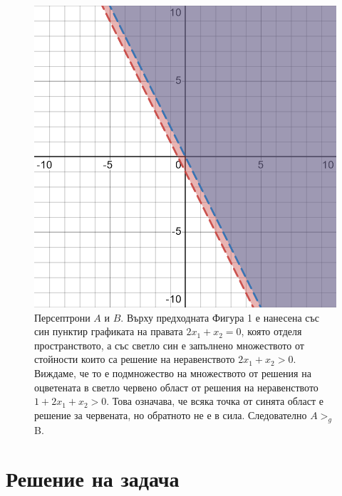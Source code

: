 \documentclass[12pt]{article}
\begin{document}
	\newpage
	\begin{figure}[H]
		\centering
		\includegraphics[width=140mm]{desmos-graph(1).png} 
		\caption{Персептрони $A$ и $B$. Върху предходната Фигура 1 е нанесена със син пунктир графиката на правата $2x_{1} + x_{2} = 0$, която отделя пространството, а със светло син е запълнено множеството от стойности които са решение на неравенството $2x_{1} + x_{2} > 0$. Виждаме, че то е подмножество на множеството от решения на оцветената в светло червено област от решения на неравенството $1 + 2x_{1} + x_{2} > 0$. Това означава, че всяка точка от синята област е решение за червената, но обратното не е в сила. Следователно $A >_{g}$ B.}
	\end{figure}

		
	\newpage
	
	\section{Решение на задача }
	
\end{document}
